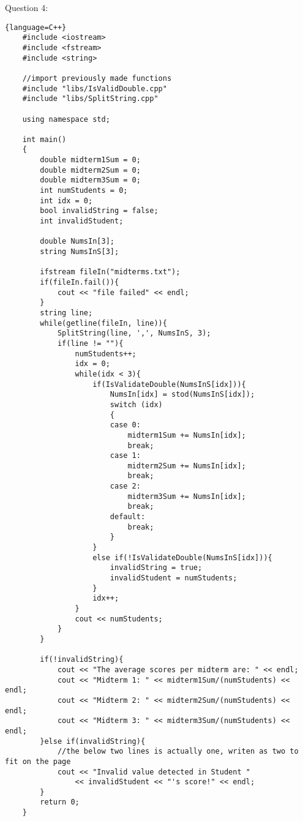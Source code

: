\documentclass{article}
\begin{document}
\vspace{1cm}

Question 4:

\begin{lstlisting}{language=C++}
    #include <iostream>
    #include <fstream>
    #include <string>
    
    //import previously made functions
    #include "libs/IsValidDouble.cpp"
    #include "libs/SplitString.cpp"
    
    using namespace std;
    
    int main()
    {
        double midterm1Sum = 0;
        double midterm2Sum = 0;
        double midterm3Sum = 0;
        int numStudents = 0;
        int idx = 0;
        bool invalidString = false;
        int invalidStudent;
    
        double NumsIn[3];
        string NumsInS[3];
    
        ifstream fileIn("midterms.txt");
        if(fileIn.fail()){
            cout << "file failed" << endl;
        }
        string line;
        while(getline(fileIn, line)){
            SplitString(line, ',', NumsInS, 3);
            if(line != ""){
                numStudents++;
                idx = 0;
                while(idx < 3){
                    if(IsValidateDouble(NumsInS[idx])){
                        NumsIn[idx] = stod(NumsInS[idx]);
                        switch (idx)
                        {
                        case 0:
                            midterm1Sum += NumsIn[idx];
                            break;
                        case 1:
                            midterm2Sum += NumsIn[idx];
                            break;
                        case 2:
                            midterm3Sum += NumsIn[idx];
                            break;
                        default:
                            break;
                        }
                    }
                    else if(!IsValidateDouble(NumsInS[idx])){
                        invalidString = true;
                        invalidStudent = numStudents;
                    }
                    idx++;
                }
                cout << numStudents;
            }
        }
    
        if(!invalidString){
            cout << "The average scores per midterm are: " << endl;
            cout << "Midterm 1: " << midterm1Sum/(numStudents) << endl;
            cout << "Midterm 2: " << midterm2Sum/(numStudents) << endl;
            cout << "Midterm 3: " << midterm3Sum/(numStudents) << endl;
        }else if(invalidString){
            //the below two lines is actually one, writen as two to fit on the page
            cout << "Invalid value detected in Student " 
                << invalidStudent << "'s score!" << endl;
        }
        return 0;
    }    
\end{lstlisting}
\end{document}
